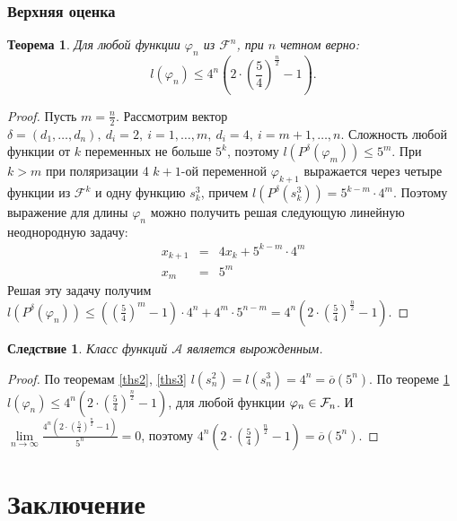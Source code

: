\documentclass[bibliography=totoc, a4paper, 14pt]{extarticle}
\newtheorem{myth}{Теорема}
\newtheorem*{myco}{Следствие}
\newcommand{\pphi}[1] {P^{\delta}(\varphi_{#1})}
\def\in{\mathchar"3232\nobreak\discretionary{}{\usefont{OMS}{cmsy}{m}{n}\char50}{}}
\begin{document}
\subsubsection{Верхняя оценка}

\begin{myth}
\label{thh}
Для любой функции $\varphi_n$ из $\mathcal{F}^n$, при $n$ четном верно:
$$ l(\varphi_n) \leqslant 4^n\left( 2 \cdot \left (\frac{5}{4} \right)^{\frac{n}{2}} - 1 \right).$$
\end{myth}
\begin{proof}
Пусть $m = \frac{n}{2}$.
Рассмотрим вектор $\delta=(d_1,\dots,d_n),\ d_i = 2,\ i=1,\dots,m,\ d_i=4,
{\ i=m+1,\dots,n}$. Сложность любой функции от $k$ переменных не больше $5^k$, поэтому
$l(\pphi{m}) \leqslant 5^m$. При $k > m$ при поляризации 4 $k+1$-ой переменной
$\varphi_{k+1}$ выражается через четыре функции из $\mathcal{F}^k$ и одну функцию $s^3_k$, причем
$l(P^{\delta}(s^3_k)) = 5^{k-m} \cdot 4^m$. Поэтому выражение для длины
$\varphi_n$ можно получить решая следующую линейную неоднородную задачу:
$$ \begin{array}{lcl}
x_{k+1} &=& 4 x_k + 5^{k-m}\cdot 4^m \\
x_m     &=& 5^m
\end{array} $$
Решая эту задачу получим $l(\pphi{n}) \leqslant \left(\left(\frac{5}{4}\right)^m - 1 \right)\cdot
4^n+4^m\cdot 5^{n-m} = 4^n \left(2 \cdot\left(\frac{5}{4}\right)^{\frac{n}{2}}-1\right)$.
\end{proof}

\begin{myco}
Класс функций $\mathcal{A}$ является вырожденным.
\end{myco}
\begin{proof}
По теоремам \ref{ths2}, \ref{ths3} $l(s^2_n)=l(s^3_n)=4^n=\overline{o}(5^n)$. По теореме \ref{thh}
${l(\varphi_n) \leqslant 4^n \left(2 \cdot\left(\frac{5}{4}\right)^{\frac{n}{2}}-1\right)}$, для
любой функции $\varphi_n \in \mathcal{F}_n$. И $\lim\limits_{n \rightarrow \infty} \frac{4^n
\left(2 \cdot\left(\frac{5}{4}\right)^{\frac{n}{2}}-1\right)}{5^n} = 0$, поэтому
$4^n \left(2 \cdot\left(\frac{5}{4}\right)^{\frac{n}{2}}-1\right) = \overline{o}(5^n)$.
\end{proof}

\newpage
\section{Заключение}
\end{document}
